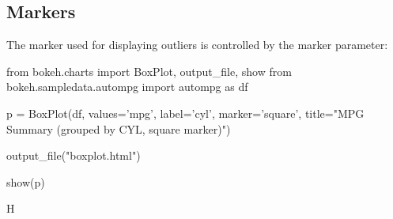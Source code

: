 \subsection{Markers}
The marker used for displaying outliers is controlled by the marker parameter:

from bokeh.charts import BoxPlot, output_file, show
from bokeh.sampledata.autompg import autompg as df

p = BoxPlot(df, values='mpg', label='cyl', marker='square',
title="MPG Summary (grouped by CYL, square marker)")

output_file("boxplot.html")

show(p)

H

